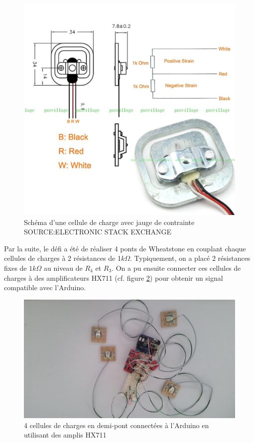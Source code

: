 \documentclass{polytech/polytech}
\begin{document}
\begin{figure}
\begin{center}
\includegraphics[scale=0.2]{image/load_sensor.jpg}
\end{center}
\caption{Schéma d'une cellule de charge avec jauge de contrainte SOURCE:ELECTRONIC STACK EXCHANGE}
\label{fig:load_sensor}
\end{figure}

Par la suite, le défi a été de réaliser 4 ponts de Wheatstone en couplant chaque cellules de charges à 2 résistances de 1$k\Omega$. Typiquement, on a placé 2 résistances fixes de $1k\Omega$ au niveau de $R_4$ et $R_3$.  On a pu ensuite connecter ces cellules de charges à des amplificateurs HX711 (cf. figure \ref{fig:load_sensor_connected}) pour obtenir un signal compatible avec l'Arduino.

\begin{figure}
\begin{center}
\includegraphics[scale=0.2]{image/load_sensor_connected.jpg}
\end{center}
\caption{4 cellules de charges en demi-pont connectées à l'Arduino en utilisant des amplis HX711}
\label{fig:load_sensor_connected}
\end{figure}
\end{document}
